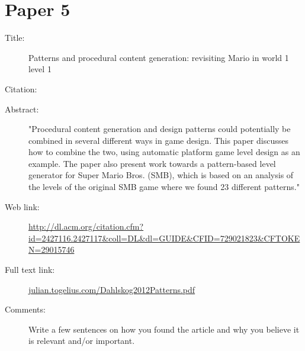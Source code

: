 \documentclass{scrartcl}
\begin{document}
\section*{Paper 5}
\begin{description}
\item[Title:] {Patterns and procedural content generation: revisiting Mario in world 1 level 1}
\item[Citation:] \cite{Dahlskog:2012}
\item[Abstract:] "Procedural content generation and design patterns could potentially be combined in several different ways in game design. This paper discusses how to combine the two, using automatic platform game level design as an example. The paper also present work towards a pattern-based level generator for Super Mario Bros. (SMB), which is based on an analysis of the levels of the original SMB game where we found 23 different patterns."
\item[Web link:] \url{http://dl.acm.org/citation.cfm?id=2427116.2427117&coll=DL&dl=GUIDE&CFID=729021823&CFTOKEN=29015746}
\item[Full text link:] \url{julian.togelius.com/Dahlskog2012Patterns.pdf}
\item[Comments:] Write a few sentences on how you found the article and why you believe it is relevant and/or important.
\end{description}



\end{document}
